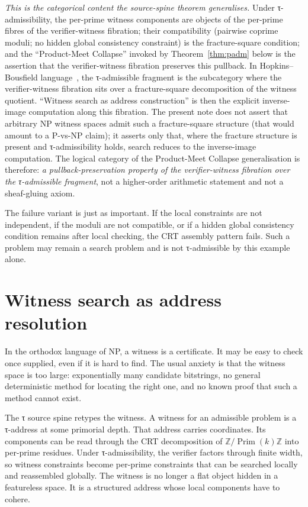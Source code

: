 \documentclass{pantarhei-researchnote}
\newcommand{\Prim}{\ensuremath{\operatorname{Prim}}}
\begin{document}
\emph{This is the categorical content the source-spine theorem
generalises.} Under τ-admissibility, the per-prime witness components
are objects of the per-prime fibres of the verifier-witness fibration;
their compatibility (pairwise coprime moduli; no hidden global
consistency constraint) is the fracture-square condition; and the
``Product-Meet Collapse'' invoked by Theorem~\ref{thm:padm} below is
the assertion that the verifier-witness fibration preserves this
pullback. In Hopkins--Bousfield language~\cite{HopkinsBousfieldFracture},
the τ-admissible fragment is the subcategory where the
verifier-witness fibration sits over a fracture-square decomposition
of the witness quotient. ``Witness search as address construction'' is
then the explicit inverse-image computation along this fibration. The
present note does not assert that arbitrary NP witness spaces admit
such a fracture-square structure (that would amount to a P-vs-NP
claim); it asserts only that, where the fracture structure is present
and τ-admissibility holds, search reduces to the inverse-image
computation. The logical category of the Product-Meet Collapse
generalisation is therefore: \emph{a pullback-preservation property
of the verifier-witness fibration over the τ-admissible fragment},
not a higher-order arithmetic statement and not a sheaf-gluing axiom.

The failure variant is just as important. If the local constraints are not
independent, if the moduli are not compatible, or if a hidden global
consistency condition remains after local checking, the CRT assembly
pattern fails. Such a problem may remain a search problem and is not
τ-admissible by this example alone.

\section{Witness search as address resolution}
\label{sec:witness-search}

In the orthodox language of NP, a witness is a certificate. It may be easy
to check once supplied, even if it is hard to find. The usual anxiety is
that the witness space is too large: exponentially many candidate
bitstrings, no general deterministic method for locating the right one,
and no known proof that such a method cannot exist.

The τ source spine retypes the witness. A witness for an admissible
problem is a τ-address at some primorial depth. That address carries
coordinates. Its components can be read through the CRT decomposition of
\(\mathbb{Z}/\Prim(k)\mathbb{Z}\) into per-prime residues. Under
τ-admissibility, the verifier factors through finite width, so witness
constraints become per-prime constraints that can be searched locally and
reassembled globally. The witness is no longer a flat object hidden in a
featureless space. It is a structured address whose local components have
to cohere.
\end{document}

